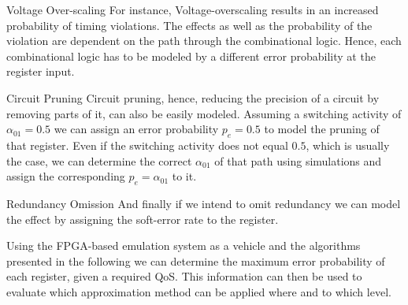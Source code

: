 \documentclass[conference]{IEEEtran}
\begin{document}
\begin{LaTeXdescription}
\item[Voltage Over-scaling] For instance, Voltage-overscaling results in an increased probability of timing violations. The effects as well as the probability of the violation are dependent on the path through the combinational logic. Hence, each combinational logic has to be modeled by a different error probability at the register input.
\item[Circuit Pruning] Circuit pruning, hence, reducing the precision of a circuit by removing parts of it, can also be easily modeled. Assuming a switching activity of $\alpha_{01}=0.5$ we can assign an error probability $p_e=0.5$ to model the pruning of that register. Even if the switching activity does not equal $0.5$, which is usually the case, we can determine the correct $\alpha_{01}$ of that path using simulations and assign the corresponding $p_e=\alpha_{01}$ to it.
\item [Redundancy Omission] And finally if we intend to omit redundancy we can model the effect by assigning the soft-error rate to the register.
\end{LaTeXdescription}
Using the FPGA-based emulation system as a vehicle and the algorithms presented in the following we can determine the maximum error probability of each register, given a required QoS. This information can then be used to evaluate which approximation method can be applied where and to which level.
\end{document}
